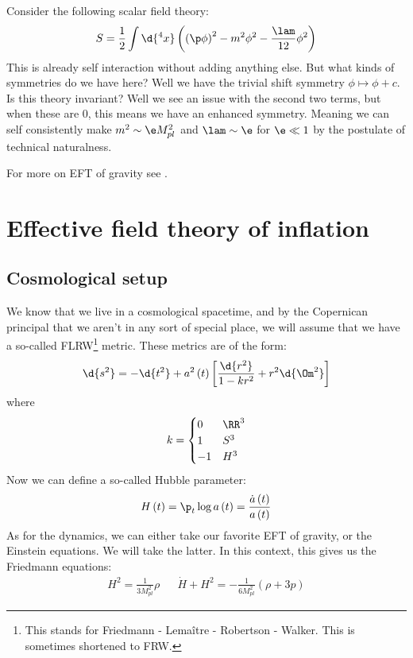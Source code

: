 \documentclass{booc}
\begin{document}
\begin{exm}
Consider the following scalar field theory:
\begin{equation}
S = \frac{1}{2} \int \d{^4 x} \left( \left( \p \phi \right)^2 - m^2 \phi^2 - 
\frac{\lam}{12} \phi^2 \right)
\end{equation}
This is already self interaction without adding anything else.
But what kinds of symmetries do we have here? Well we have the trivial shift symmetry
$\phi \mapsto \phi + c$. 
Is this theory invariant? Well we see an issue with the second two terms, but when
these are $0$, this means we have an enhanced symmetry. Meaning we can self consistently make
$m^2 \sim \e M_{pl}^2$ and $\lam \sim \e$ for $\e \ll 1$ by the postulate of technical naturalness.
\end{exm}


For more on EFT of gravity see \cites{burgess_gravity_1,burgess_gravity_2}.

\section{Effective field theory of inflation}

\subsection{Cosmological setup}

We know that we live in a cosmological spacetime, and by the Copernican principal
that we aren't in any sort of special place, we will assume that we have a so-called FLRW\footnote{
This stands for Friedmann - Lema\^itre - Robertson - Walker.
This is sometimes shortened to FRW.} metric. These metrics are of the form:
\begin{equation}
\d{s^2} = -\d{t^2} + a^2\left( t \right) \left[ 
\frac{\d{r^2}}{1 - kr^2} + r^2 \d{\Om^2}\right]
\end{equation}
where
\begin{equation}
k = 
\begin{cases}
0 & \RR^3 \\
1 & S^3 \\
-1 & H^3
\end{cases}
\end{equation}
Now we can define a so-called Hubble parameter:
\begin{equation}
H\left( t \right) = \p_t \log a\left( t \right) = \frac{\dot a\left( t \right)}{a\left( t \right)}
\end{equation}
As for the dynamics, we can either take our favorite EFT of gravity, or the Einstein equations. 
We will take the latter. In this context, this gives us the Friedmann equations:
\begin{align}
H^2  = \frac{1}{3M_{pl}^2} \rho &&
\dot H + H^2 = -\frac{1}{6 M_{pl}^2 }\left( \rho + 3p \right)
\end{align}
\end{document}
